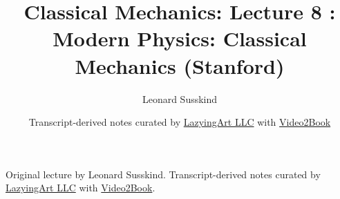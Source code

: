 \documentclass[11pt,oneside]{book}
\begin{document}
\frontmatter
\title{Classical Mechanics: Lecture 8 : Modern Physics: Classical Mechanics (Stanford)}
\author{Leonard Susskind}
\date{Transcript-derived notes curated by \href{https://lazying.art}{LazyingArt LLC} with \href{https://github.com/lachlanchen/Video2Book}{Video2Book}}
\maketitle
\begin{center}
\small Original lecture by Leonard Susskind. Transcript-derived notes curated by \href{https://lazying.art}{LazyingArt LLC} with \href{https://github.com/lachlanchen/Video2Book}{Video2Book}.
\end{center}
\clearpage
\mainmatter

\end{document}
